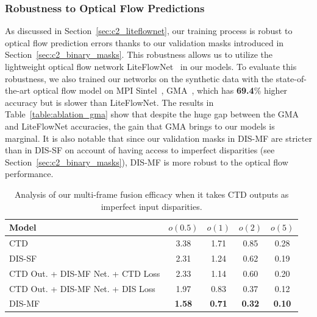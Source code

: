 \subsubsection{Robustness to Optical Flow Predictions} \label{sec:c2_ablation_gma}
As discussed in Section~\ref{sec:c2_liteflownet}, our training process is robust to optical flow prediction errors thanks to our validation masks introduced in Section~\ref{sec:c2_binary_masks}. This robustness allows us to utilize the lightweight optical flow network LiteFlowNet~\cite{hui2018liteflownet} in our models. To evaluate this robustness, we also trained our networks on the synthetic data with the state-of-the-art optical flow model on MPI Sintel~\cite{butler2012naturalistic}, GMA~\cite{jiang2021learning}, which has \textbf{69.4}\% higher accuracy but is slower than LiteFlowNet. The results in Table~\ref{table:ablation_gma} show that despite the huge gap between the GMA and LiteFlowNet accuracies, the gain that GMA brings to our models is marginal. It is also notable that since our validation masks in DIS-MF are stricter than in DIS-SF on account of having access to imperfect disparities (see Section~\ref{sec:c2_binary_masks}), DIS-MF is more robust to the optical flow performance.


\begin{table}[t]
    \begin{center}
        \begin{tabular}{lcccc}
        \hline
        Model & $o(0.5)$ & $o(1)$ & $o(2)$ & $o(5)$ \\
        \hline
        CTD & 3.38 & 1.71 & 0.85 & 0.28 \\
        DIS-SF & 2.31 & 1.24 & 0.62 & 0.19 \\
        \arrayrulecolor{lightgray}\hline\arrayrulecolor{black}
        CTD Out. + DIS-MF Net. + CTD Loss & 2.33 & 1.14 & 0.60 & 0.20 \\
        CTD Out. + DIS-MF Net. + DIS Loss & 1.97 & 0.83 & 0.37 & 0.12 \\
        DIS-MF & \textbf{1.58} & \textbf{0.71} & \textbf{0.32} & \textbf{0.10} \\
        \hline
        \end{tabular}
    \end{center}
    \caption{Analysis of our multi-frame fusion efficacy when it takes CTD outputs as imperfect input disparities.}
    \label{table:ablation_ctd_dis_mf}
\end{table}


